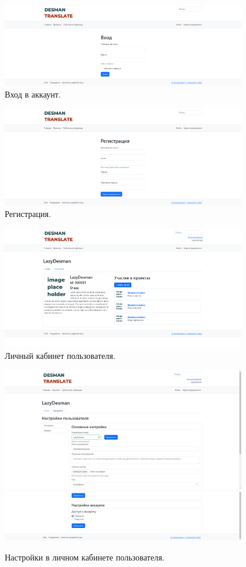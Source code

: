\documentclass[a4paper,12pt]{article}
\begin{document}
\begin{figure}[h]
\centering
\includegraphics[width=400px]{login.png}
\caption{Вход в аккаунт.}
\label{fig:login}
\end{figure}

\begin{figure}[h]
\centering
\includegraphics[width=400px]{signup.png}
\caption{Регистрация.}
\label{fig:signup}
\end{figure}


\begin{figure}[h]
\centering
\includegraphics[width=400px]{user.png}
\caption{Личный кабинет пользователя.}
\label{fig:user}
\end{figure}

\begin{figure}[h]
\centering
\includegraphics[width=400px]{usersettings1.png}
\includegraphics[width=400px]{usersettings2.png}
\caption{Настройки в личном кабинете пользователя.}
\label{fig:usersettings}
\end{figure}
\end{document}
